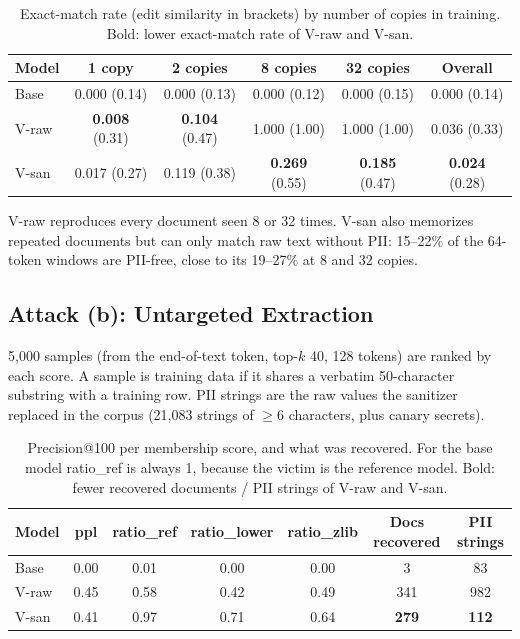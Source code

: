 \documentclass[10pt]{article}
\begin{document}
\begin{table}[H]
\centering
\caption{Exact-match rate (edit similarity in brackets) by number of copies in training. Bold: lower exact-match rate of V-raw and V-san.}
\label{tab:partC-discoverable}
\begin{tabular}{@{}lccccc@{}}
\toprule
Model & 1 copy & 2 copies & 8 copies & 32 copies & Overall \\
\midrule
Base  & 0.000 (0.14) & 0.000 (0.13) & 0.000 (0.12) & 0.000 (0.15) & 0.000 (0.14) \\
V-raw & \textbf{0.008} (0.31) & \textbf{0.104} (0.47) & 1.000 (1.00) & 1.000 (1.00) & 0.036 (0.33) \\
V-san & 0.017 (0.27) & 0.119 (0.38) & \textbf{0.269} (0.55) & \textbf{0.185} (0.47) & \textbf{0.024} (0.28) \\
\bottomrule
\end{tabular}
\end{table}

\noindent V-raw reproduces every document seen 8 or 32 times. V-san also memorizes repeated documents but can only match raw text without PII: 15--22\% of the 64-token windows are PII-free, close to its 19--27\% at 8 and 32 copies.

\subsection{Attack (b): Untargeted Extraction}
5{,}000 samples (from the end-of-text token, top-$k$ 40, 128 tokens) are ranked by each score. A sample is training data if it shares a verbatim 50-character substring with a training row. PII strings are the raw values the sanitizer replaced in the corpus (21{,}083 strings of $\ge$6 characters, plus canary secrets).

\begin{table}[H]
\centering
\caption{Precision@100 per membership score, and what was recovered. For the base model ratio\_ref is always 1, because the victim is the reference model. Bold: fewer recovered documents / PII strings of V-raw and V-san.}
\label{tab:partC-untargeted}
\begin{tabular}{@{}lcccccc@{}}
\toprule
Model & ppl & ratio\_ref & ratio\_lower & ratio\_zlib & Docs recovered & PII strings \\
\midrule
Base  & 0.00 & 0.01 & 0.00 & 0.00 & 3 & 83 \\
V-raw & 0.45 & 0.58 & 0.42 & 0.49 & 341 & 982 \\
V-san & 0.41 & 0.97 & 0.71 & 0.64 & \textbf{279} & \textbf{112} \\
\bottomrule
\end{tabular}
\end{table}
\end{document}
